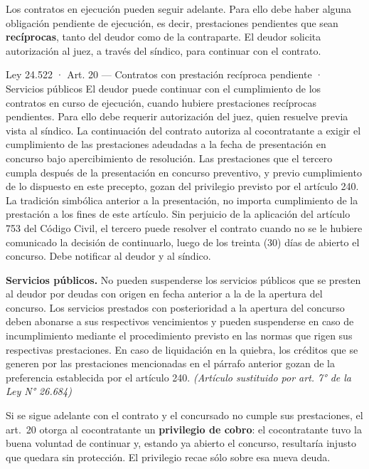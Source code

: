 \documentclass[12pt,oneside]{book}
\begin{document}
Los contratos en ejecución pueden seguir adelante. Para ello debe haber alguna obligación pendiente de ejecución, es decir, prestaciones pendientes que sean \textbf{recíprocas}, tanto del deudor como de la contraparte. El deudor solicita autorización al juez, a través del síndico, para continuar con el contrato.

\begin{norma}{Ley 24.522 · Art. 20 — Contratos con prestación recíproca pendiente · Servicios públicos}
El deudor puede continuar con el cumplimiento de los contratos en curso de ejecución, cuando hubiere prestaciones recíprocas pendientes. Para ello debe requerir autorización del juez, quien resuelve previa vista al síndico. La continuación del contrato autoriza al cocontratante a exigir el cumplimiento de las prestaciones adeudadas a la fecha de presentación en concurso bajo apercibimiento de resolución. Las prestaciones que el tercero cumpla después de la presentación en concurso preventivo, y previo cumplimiento de lo dispuesto en este precepto, gozan del privilegio previsto por el artículo 240. La tradición simbólica anterior a la presentación, no importa cumplimiento de la prestación a los fines de este artículo. Sin perjuicio de la aplicación del artículo 753 del Código Civil, el tercero puede resolver el contrato cuando no se le hubiere comunicado la decisión de continuarlo, luego de los treinta (30) días de abierto el concurso. Debe notificar al deudor y al síndico.

\textbf{Servicios públicos.} No pueden suspenderse los servicios públicos que se presten al deudor por deudas con origen en fecha anterior a la de la apertura del concurso. Los servicios prestados con posterioridad a la apertura del concurso deben abonarse a sus respectivos vencimientos y pueden suspenderse en caso de incumplimiento mediante el procedimiento previsto en las normas que rigen sus respectivas prestaciones. En caso de liquidación en la quiebra, los créditos que se generen por las prestaciones mencionadas en el párrafo anterior gozan de la preferencia establecida por el artículo 240. \textit{(Artículo sustituido por art. 7° de la Ley N° 26.684)}
\end{norma}

Si se sigue adelante con el contrato y el concursado no cumple sus prestaciones, el art.~20 otorga al cocontratante un \textbf{privilegio de cobro}: el cocontratante tuvo la buena voluntad de continuar y, estando ya abierto el concurso, resultaría injusto que quedara sin protección. El privilegio recae sólo sobre esa nueva deuda.
\end{document}
